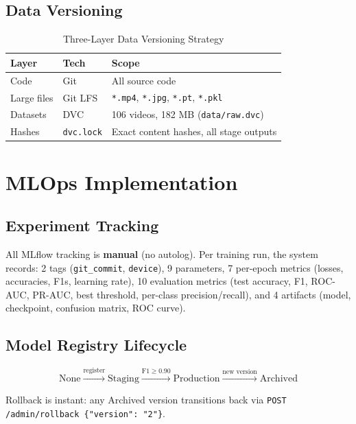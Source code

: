 \documentclass[conference]{IEEEtran}
\begin{document}
\subsection{Data Versioning}

\begin{table}[H]
\centering
\caption{Three-Layer Data Versioning Strategy}
\label{tab:versioning}
\begin{tabular}{@{}L{1.5cm}L{2cm}L{4cm}@{}}
\toprule
\textbf{Layer} & \textbf{Tech} & \textbf{Scope} \\
\midrule
Code        & Git          & All source code \\
Large files & Git LFS      & \texttt{*.mp4}, \texttt{*.jpg}, \texttt{*.pt}, \texttt{*.pkl} \\
Datasets    & DVC          & 106 videos, 182 MB (\texttt{data/raw.dvc}) \\
Hashes      & \texttt{dvc.lock} & Exact content hashes, all stage outputs \\
\bottomrule
\end{tabular}
\end{table}

\section{MLOps Implementation}
\label{sec:mlops}

\subsection{Experiment Tracking}

All MLflow tracking is \textbf{manual} (no autolog). Per training run, the system records: 2 tags (\texttt{git\_commit}, \texttt{device}), 9 parameters, 7 per-epoch metrics (losses, accuracies, F1s, learning rate), 10 evaluation metrics (test accuracy, F1, ROC-AUC, PR-AUC, best threshold, per-class precision/recall), and 4 artifacts (model, checkpoint, confusion matrix, ROC curve).

\subsection{Model Registry Lifecycle}

\[
\text{None} \xrightarrow{\text{register}} \text{Staging} \xrightarrow{\text{F1} \geq 0.90} \text{Production} \xrightarrow{\text{new version}} \text{Archived}
\]

Rollback is instant: any Archived version transitions back via \texttt{POST /admin/rollback \{"version": "2"\}}.
\end{document}
